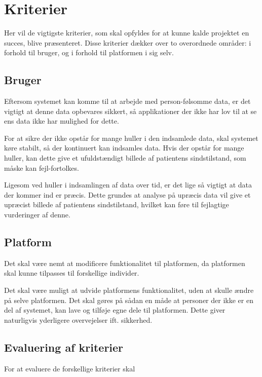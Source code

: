 \section{Kriterier}
Her vil de vigtigste kriterier, som skal opfyldes for at kunne kalde projektet en succes, blive præsenteret.
Disse kriterier dækker over to overordnede områder: i forhold til bruger, og i forhold til platformen i sig selv.

\subsection{Bruger}
\begin{description}[style=nextline]
	\item[Sikkerhed] 
		Eftersom systemet kan komme til at arbejde med person-følsomme data, er det vigtigt at denne data opbevares sikkert, så applikationer der ikke har lov til at se ens data ikke har mulighed for dette.
	\item[Stabilitet]
		For at sikre der ikke opstår for mange huller i den indsamlede data, skal systemet køre stabilt, så der kontinuert kan indsamles data.
	Hvis der opstår for mange huller, kan dette give et ufuldstændigt billede af patientens sindstilstand, som måske kan fejl-fortolkes.
	\item[Præcision]
		Ligesom ved huller i indsamlingen af data over tid, er det lige så vigtigt at data der kommer ind er præcis.
	Dette grundes at analyse på upræcis data vil give et upræcist billede af patientens sindstilstand, hvilket kan føre til fejlagtige vurderinger af denne.	
\end{description}

\subsection{Platform}
\begin{description}[style=nextline]
	\item[Fleksibilitet]
	Det skal være nemt at modificere funktionalitet til platformen, da platformen skal kunne tilpasses til forskellige individer.
	\item[Mulighed for udvidelse]
	Det skal være muligt at udvide platformens funktionalitet, uden at skulle ændre på selve platformen.
	Det skal gøres på sådan en måde at personer der ikke er en del af systemet, kan lave og tilføje egne dele til platformen.
	Dette giver naturligvis yderligere overvejelser ift. sikkerhed.
\end{description}

\subsection{Evaluering af kriterier}
For at evaluere de forskellige kriterier skal


